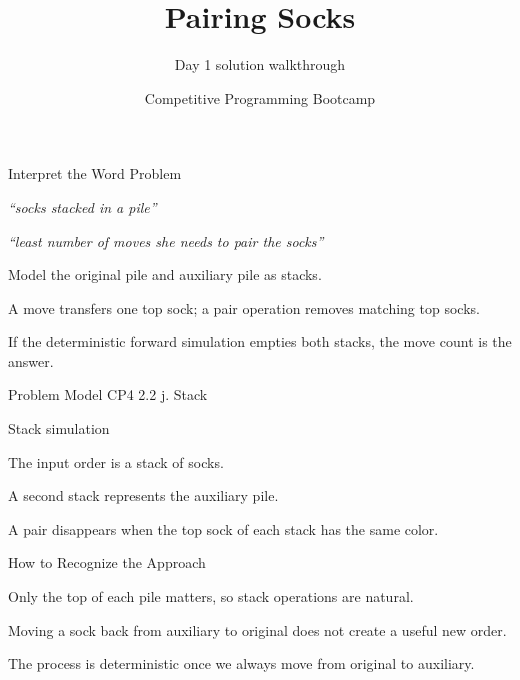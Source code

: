 \documentclass[aspectratio=169,11pt]{beamer}
\title[pairingsocks]{Pairing Socks}
\subtitle{Day 1 solution walkthrough}
\author[Solution Deck]{Competitive Programming Bootcamp}
\date{}
\begin{document}
\begin{frame}[plain]
  \titlepage
\end{frame}

\begin{frame}{Interpret the Word Problem}
\small
{}
\begin{tightitemize}
  \item \textit{``socks stacked in a pile''}
  \item \textit{``least number of moves she needs to pair the socks''}
\end{tightitemize}

\vspace{0.18cm}
\begin{tightitemize}
  \item Model the original pile and auxiliary pile as stacks.
  \item A move transfers one top sock; a pair operation removes matching top socks.
  \item If the deterministic forward simulation empties both stacks, the move count is the answer.
\end{tightitemize}
\end{frame}







\begin{frame}{Problem Model}
\small
{} CP4 2.2 j. Stack

\vspace{0.25cm}
 Stack simulation

\vspace{0.25cm}
\begin{tightitemize}
  \item The input order is a stack of socks.
  \item A second stack represents the auxiliary pile.
  \item A pair disappears when the top sock of each stack has the same color.
\end{tightitemize}
\end{frame}

\begin{frame}{How to Recognize the Approach}
\begin{tightitemize}
  \item Only the top of each pile matters, so stack operations are natural.
  \item Moving a sock back from auxiliary to original does not create a useful new order.
  \item The process is deterministic once we always move from original to auxiliary.
\end{tightitemize}
\end{frame}
\end{document}
